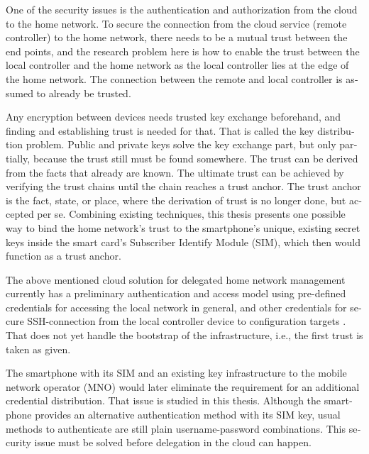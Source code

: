 \documentclass[12pt,a4paper,english]{tutthesis}
\begin{document}
\begin{otherlanguage}{english}
One of the security issues is the authentication and authorization 
from the cloud to the home network.
To secure the connection from the cloud service (remote controller)
to the home network, there needs to be a mutual trust between the end
points, and the research problem here is how to enable the trust between the
local controller and the home network as the local controller lies at the edge of the
home network. The connection between the remote and local
controller is assumed to already be trusted.



Any encryption between devices needs trusted key exchange beforehand,
and finding and establishing trust is needed for that.  That is called
the key distribution problem. Public and private keys solve the key exchange part, but
only partially, because the trust still must be found somewhere.
The trust can be derived from the facts that already are known.  
The ultimate trust can be achieved by verifying the trust chains 
until the chain reaches a trust anchor.
The trust anchor is the fact, state, or place,
where the derivation of trust is no longer done, but accepted per se.
Combining existing techniques, this thesis presents one possible way
to bind the home network's trust to the smartphone's unique, existing
secret keys inside the smart card's Subscriber Identify Module (SIM),
which then would function as a trust anchor. 



The above mentioned cloud solution for delegated home network
management currently has a preliminary authentication and access model
using pre-defined credentials for accessing the local network in general, and other
credentials for secure SSH-connection from the local
controller device to configuration
targets \cite[Chap.4]{silverajan2015collaborative}.
That does not yet handle the bootstrap of the 
infrastructure, i.e., the first trust is taken as given. 

The smartphone with its SIM and an
existing key infrastructure to the mobile
network operator (MNO) would later eliminate the requirement for an
additional credential distribution. That issue is studied in this
thesis.  Although the smartphone provides an alternative authentication
method with its SIM key, usual methods to authenticate are still plain
username-password combinations.  This security issue must be solved
before delegation in the cloud can happen.












\end{otherlanguage}
\end{document}
